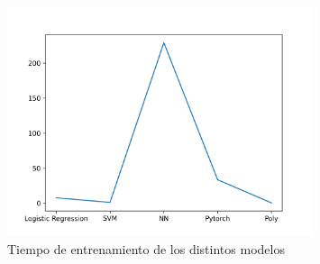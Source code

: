 \documentclass[6pt]{../../shared/AiTex}
\begin{document}
\begin{figure}[H]
    \centering
    \includegraphics[width=0.8\textwidth]{./images/times.png}
    \caption{Tiempo de entrenamiento de los distintos modelos}
\end{figure}
\end{document}
